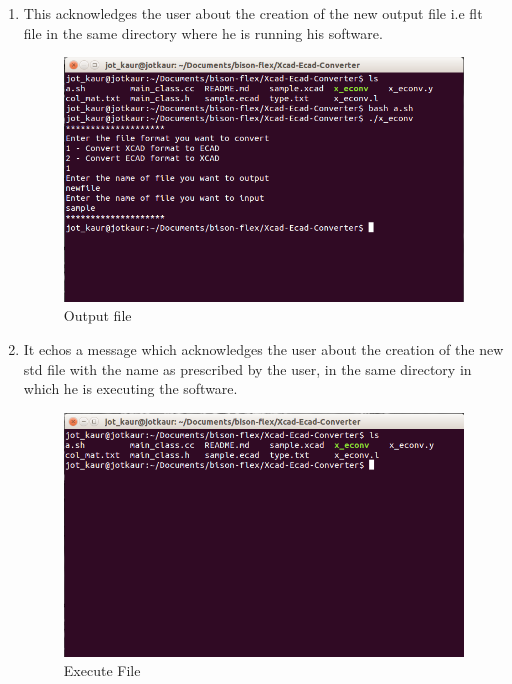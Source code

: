 \begin{enumerate}
\item This acknowledges the user about the creation of the new output file i.e flt file in the same directory where he is running his software.\\
\begin{figure} [h!]
\centering
\includegraphics[scale=0.3]{images/ecad4.png}
\caption{Output file}
\end{figure}

\item  It echos a message which acknowledges the user about the creation of the new std file with the name as prescribed by the user, in the same directory in which he is executing the software.
\begin{figure} [h!]
\centering
\includegraphics[scale=0.3]{images/ecadfiles.png}
\caption{Execute File}
\end{figure}

\end{enumerate}


